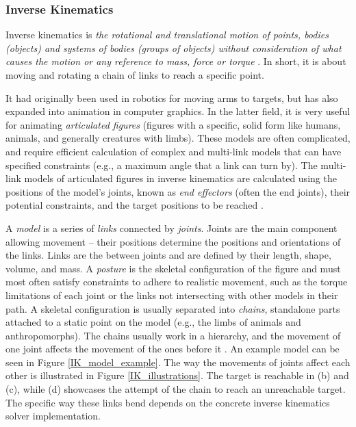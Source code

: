 \subsubsection{Inverse Kinematics}
Inverse kinematics is \emph{the rotational and translational motion of
points, bodies (objects) and systems of bodies (groups of objects)
without consideration of what causes the motion or any reference
to mass, force or torque} \cite{Aristidou2018IKSurvey}. In short, it is about moving and rotating a chain of links to reach a specific point.

It had originally been used in robotics for moving arms to targets, but has also expanded into animation in computer graphics. In the latter field, it is very useful for animating \emph{articulated figures} (figures with a specific, solid form like humans, animals, and generally creatures with limbs). These models are often complicated, and require efficient calculation of complex and multi-link models that can have specified constraints (e.g., a maximum angle that a link can turn by). The multi-link models of articulated figures in inverse kinematics are calculated using the positions of the model's joints, known as \emph{end effectors} (often the end joints), their potential constraints, and the target positions to be reached \cite{Aristidou2018IKSurvey}.

A \emph{model} is a series of \emph{links} connected by \emph{joints}. Joints are the main component allowing movement -- their positions determine the positions and orientations of the links. Links are the  between joints and are defined by their length, shape, volume, and mass. A \emph{posture} is the skeletal configuration of the figure and must most often satisfy constraints to adhere to realistic movement, such as the torque limitations of each joint or the links not intersecting with other models in their path. A skeletal configuration is usually separated into \emph{chains}, standalone parts attached to a static point on the model (e.g., the limbs of animals and anthropomorphs). The chains usually work in a hierarchy, and the movement of one joint affects the movement of the ones before it \cite{Aristidou2018IKSurvey}. An example model can be seen in Figure \ref{IK_model_example}. The way the movements of joints affect each other is illustrated in Figure \ref{IK_illustrations}. The target is reachable in (b) and (c), while (d) showcases the attempt of the chain to reach an unreachable target. The specific way these links bend depends on the concrete inverse kinematics solver implementation.

